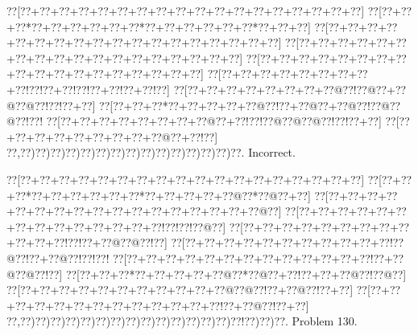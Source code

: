 \documentclass[a5paper]{article}
\begin{document}
\begin{center}
{\goo
\0??[\0??+\0??+\0??+\0??+\0??+\0??+\0??+\0??+\0??+\0??+\0??+\0??+\0??+\0??+\0??+\0??+\0??+\0??]
\0??[\0??+\0??+\0??*\0??+\0??+\0??+\0??+\0??+\0??*\0??+\0??+\0??+\0??+\0??+\0??*\0??+\0??+\0??]
\0??[\0??+\0??+\0??+\0??+\0??+\0??+\0??+\0??+\0??+\0??+\0??+\0??+\0??+\0??+\0??+\0??+\0??+\0??]
\0??[\0??+\0??+\0??+\0??+\0??+\0??+\0??+\0??+\0??+\0??+\0??+\0??+\0??+\0??+\0??+\0??+\0??+\0??]
\0??[\0??+\0??+\0??+\0??+\0??+\0??+\0??+\0??+\0??+\0??+\0??+\0??+\0??+\0??+\0??+\0??+\0??+\0??]
\0??[\0??+\0??+\0??+\0??+\0??+\0??+\0??+\0??+\0??!\0??!\0??+\0??!\0??!\0??+\0??!\0??+\0??!\0??]
\0??[\0??+\0??+\0??+\0??+\0??+\0??+\0??+\0??@\0??!\0??@\0??+\0??@\0??@\0??!\0??!\0??+\0??]
\0??[\0??+\0??+\0??*\0??+\0??+\0??+\0??+\0??@\0??!\0??+\0??@\0??+\0??@\0??!\0??@\0??@\0??!\0??!
\0??[\0??+\0??+\0??+\0??+\0??+\0??+\0??+\0??@\0??+\0??!\0??!\0??@\0??@\0??@\0??!\0??!\0??+\0??]
\0??[\0??+\0??+\0??+\0??+\0??+\0??+\0??+\0??+\0??@\0??+\0??!\0??]
\0??,\0??)\0??)\0??)\0??)\0??)\0??)\0??)\0??)\0??)\0??)\0??)\0??)\0??)\0??)\0??.
}
Incorrect. 

\end{center}
\newpage
\begin{center}
{\goo
\0??[\0??+\0??+\0??+\0??+\0??+\0??+\0??+\0??+\0??+\0??+\0??+\0??+\0??+\0??+\0??+\0??+\0??+\0??]
\0??[\0??+\0??+\0??*\0??+\0??+\0??+\0??+\0??+\0??*\0??+\0??+\0??+\0??+\0??@\0??*\0??@\0??+\0??]
\0??[\0??+\0??+\0??+\0??+\0??+\0??+\0??+\0??+\0??+\0??+\0??+\0??+\0??+\0??+\0??+\0??+\0??@\0??]
\0??[\0??+\0??+\0??+\0??+\0??+\0??+\0??+\0??+\0??+\0??+\0??+\0??+\0??+\0??!\0??!\0??!\0??@\0??]
\0??[\0??+\0??+\0??+\0??+\0??+\0??+\0??+\0??+\0??+\0??+\0??+\0??!\0??!\0??+\0??@\0??@\0??!\0??]
\0??[\0??+\0??+\0??+\0??+\0??+\0??+\0??+\0??+\0??+\0??+\0??!\0??@\0??!\0??+\0??@\0??!\0??!\0??!
\0??[\0??+\0??+\0??+\0??+\0??+\0??+\0??+\0??+\0??+\0??+\0??+\0??+\0??!\0??+\0??@\0??@\0??!\0??]
\0??[\0??+\0??+\0??*\0??+\0??+\0??+\0??+\0??@\0??*\0??@\0??+\0??!\0??+\0??+\0??@\0??!\0??@\0??]
\0??[\0??+\0??+\0??+\0??+\0??+\0??+\0??+\0??+\0??+\0??+\0??@\0??@\0??!\0??+\0??@\0??!\0??+\0??]
\0??[\0??+\0??+\0??+\0??+\0??+\0??+\0??+\0??+\0??+\0??+\0??+\0??+\0??!\0??+\0??@\0??!\0??+\0??]
\0??,\0??)\0??)\0??)\0??)\0??)\0??)\0??)\0??)\0??)\0??)\0??)\0??)\0??)\0??)\0??!\0??)\0??)\0??.
}
Problem 130.

\end{center}
\end{document}
